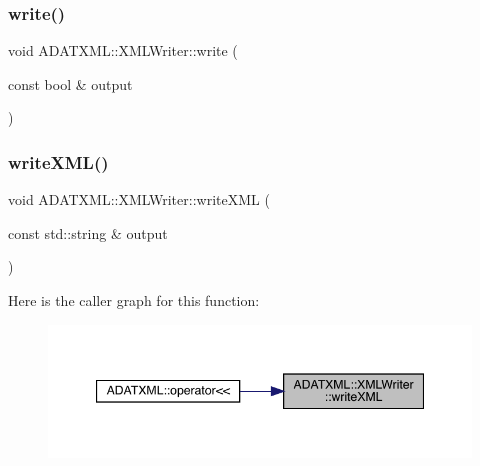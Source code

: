 \subsubsection{\texorpdfstring{write()}{write()}\hspace{0.1cm}{\footnotesize\ttfamily [20/20]}}
{\footnotesize\ttfamily void A\+D\+A\+T\+X\+M\+L\+::\+X\+M\+L\+Writer\+::write (\begin{DoxyParamCaption}\item[{const bool \&}]{output }\end{DoxyParamCaption})}

\mbox{\label{classADATXML_1_1XMLWriter_a887415a6f26bde42e76af7d831087c7e}} 
\subsubsection{\texorpdfstring{writeXML()}{writeXML()}\hspace{0.1cm}{\footnotesize\ttfamily [1/2]}}
{\footnotesize\ttfamily void A\+D\+A\+T\+X\+M\+L\+::\+X\+M\+L\+Writer\+::write\+X\+ML (\begin{DoxyParamCaption}\item[{const std\+::string \&}]{output }\end{DoxyParamCaption})}

Here is the caller graph for this function\+:\nopagebreak
\begin{figure}[H]
\begin{center}
\leavevmode
\includegraphics[width=347pt]{da/da7/classADATXML_1_1XMLWriter_a887415a6f26bde42e76af7d831087c7e_icgraph}
\end{center}
\end{figure}
\mbox{\label{classADATXML_1_1XMLWriter_a887415a6f26bde42e76af7d831087c7e}} 
